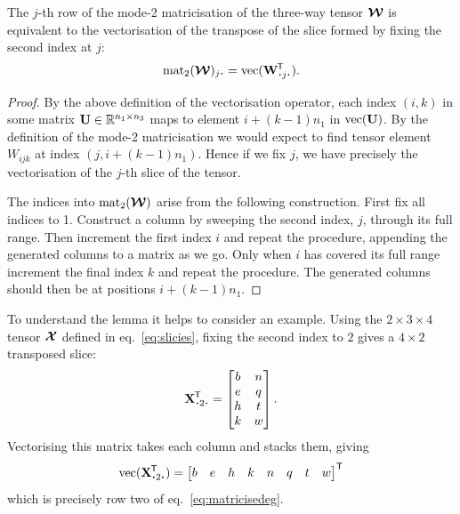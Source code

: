 \begin{lem}
The \(j\)-th row of the mode-2 matricisation of the three-way tensor \(\bm{\mathcal{W}}\)
is equivalent to the vectorisation of the transpose of the slice formed by fixing the second index 
at \(j\):
\begin{equation}\label{eq:matlemstatement}
	\matr_2 (\tensor{W})_{j \midbullet} = \vect(\tran{\mat{W}_{\midbullet j \midbullet}}).
\end{equation}
\label{lem:matricise}
\end{lem}
\begin{proof}
By the above definition of the vectorisation operator, each index \((i, k)\) in some matrix
\(\mathbf{U} \in \mathbb{R}^{n_1\times n_3}\) maps to element \(i + (k-1)n_1\) in
\(\operatorname{vec}(\mathbf{U})\). By the definition of the mode-2 matricisation we would expect to
find tensor element \(W_{ijk}\) at index \((j, i + (k-1)n_1)\). Hence if we fix \(j\), we have
precisely the vectorisation of the \(j\)-th slice of the tensor.

The indices into \(\operatorname{mat}_2(\bm{\mathcal{W}})\) arise from the following construction.
First fix all indices to 1. Construct a column by sweeping the second index, \(j\),
through its full range. Then increment the first index \(i\) and repeat the procedure, appending
the generated columns to a matrix as we go. Only when \(i\) has covered its full range
increment the final index \(k\) and repeat the procedure. The generated columns should then be
at positions \(i + (k-1)n_1\).
\end{proof}

To understand the lemma it helps to consider an example. Using the \(2 \times 3 \times 4\)
tensor \(\bm{\mathcal{X}}\) defined
in eq.~\eqref{eq:slicies}, fixing the second index to \(2\) gives a \(4 \times 2\) 
transposed slice:
\begin{equation}\label{eq:mode2slice}
	\tran{\mat{X}_{\midbullet 2 \midbullet}} = \begin{bmatrix}
		b & n \\
		e & q \\
		h & t \\
		k & w
	\end{bmatrix}.
\end{equation} Vectorising this matrix takes each column and stacks them, giving
\begin{equation}\label{eq:veceg}
	\vect(\tran{\mat{X}_{\midbullet 2 \midbullet}}) = \begin{bmatrix}
		b &
		e &
		h &
		k &
		n &
		q &
		t &
		w
	\end{bmatrix}^\mathsf{T}
\end{equation} which is precisely row two of eq.~\eqref{eq:matricisedeg}.

